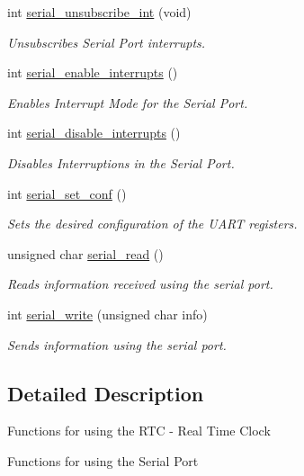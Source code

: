 \begin{DoxyCompactItemize}
int \hyperlink{group___serial_ga56e227db9f0a79bfb5fd8a753d1be67a}{serial\+\_\+unsubscribe\+\_\+int} (void)
\begin{DoxyCompactList}\small\item\em Unsubscribes Serial Port interrupts. \end{DoxyCompactList}\item 
int \hyperlink{group___serial_ga06724a3064e96e445257aba1e4f3de46}{serial\+\_\+enable\+\_\+interrupts} ()
\begin{DoxyCompactList}\small\item\em Enables Interrupt Mode for the Serial Port. \end{DoxyCompactList}\item 
int \hyperlink{group___serial_gab84b5f47451f228a5c574b77e5c7e9eb}{serial\+\_\+disable\+\_\+interrupts} ()
\begin{DoxyCompactList}\small\item\em Disables Interruptions in the Serial Port. \end{DoxyCompactList}\item 
int \hyperlink{group___serial_ga78786e639e5d536f1c65170e7396fde6}{serial\+\_\+set\+\_\+conf} ()
\begin{DoxyCompactList}\small\item\em Sets the desired configuration of the U\+A\+RT registers. \end{DoxyCompactList}\item 
unsigned char \hyperlink{group___serial_ga733df3cf88f5c81a1c4ae2822342dd2d}{serial\+\_\+read} ()
\begin{DoxyCompactList}\small\item\em Reads information received using the serial port. \end{DoxyCompactList}\item 
int \hyperlink{group___serial_ga62f6ef11a701d503d1ed5f4a873a1d2b}{serial\+\_\+write} (unsigned char info)
\begin{DoxyCompactList}\small\item\em Sends information using the serial port. \end{DoxyCompactList}\end{DoxyCompactItemize}


\subsection{Detailed Description}
Functions for using the R\+TC -\/ Real Time Clock

Functions for using the Serial Port 


